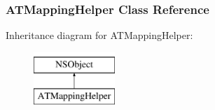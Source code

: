 \hypertarget{interface_a_t_mapping_helper}{
\subsubsection{ATMappingHelper Class Reference}
\label{interface_a_t_mapping_helper}
}
Inheritance diagram for ATMappingHelper:\begin{figure}[h]
\begin{center}
\leavevmode
\includegraphics[height=2.000000cm]{interface_a_t_mapping_helper}
\end{center}
\end{figure}
